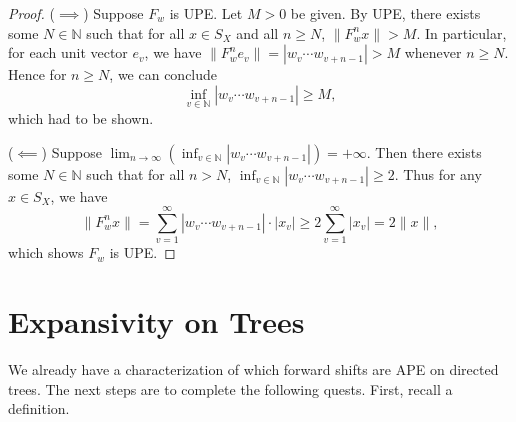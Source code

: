 \documentclass{article}
\newcommand{\ds}{\displaystyle}
\theoremstyle{definition}\newtheorem{remark}[theorem]{Remark}
\theoremstyle{definition}\newtheorem{example}[theorem]{Example}
\theoremstyle{definition}\newtheorem{fact}[theorem]{Fact}
\theoremstyle{definition}\newtheorem{diagram}[theorem]{Diagram}
\theoremstyle{definition}\newtheorem{definition}[theorem]{Definition}
\theoremstyle{definition}\newtheorem{question}[theorem]{Question}
\newcommand{\N}{\mathbb{N}}
\begin{document}
\begin{proof}
    ($\implies$) Suppose $F_w$ is UPE. Let $M>0$ be given. By UPE, there exists some $N\in \N$ such that for all $x\in S_X$ and all $n\geq N$, $\|F_w^n x\|>M$. In particular, for each unit vector $e_v$, we have $\|F_w^n e_v\|=|w_v\cdots w_{v+n-1}|>M$ whenever $n\geq N$. Hence for $n\geq N$, we can conclude
    \[\inf_{v\in \N} |w_v\cdots w_{v+n-1}|\geq M,\]
    which had to be shown.

    ($\impliedby$) Suppose $\ds\lim_{n\to \infty} (\inf_{v\in \N} |w_v\cdots w_{v+n-1}|)=+\infty.$ Then there exists some $N\in \N$ such that for all $n>N$, $\inf_{v\in \N} |w_v\cdots w_{v+n-1}|\geq 2$. Thus for any $x\in S_X$, we have 
    \[\|F_w^n x\|=\sum_{v=1}^\infty |w_v\cdots w_{v+n-1}|\cdot |x_v| \geq 2 \sum_{v=1}^\infty |x_v|=2\|x\|,\]
    which shows $F_w$ is UPE.
\end{proof}

\section{Expansivity on Trees}
We already have a characterization of which forward shifts are APE on directed trees. The next steps are to complete the following quests. First, recall a definition.
\end{document}
